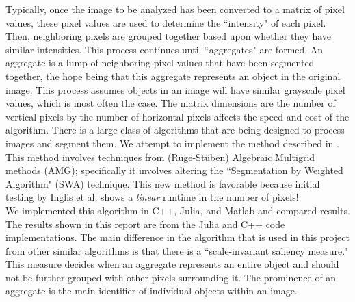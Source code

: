 \documentclass[12pt]{article}%
\begin{document}
Typically, once the image to be analyzed has been converted to a matrix of pixel values, these pixel values are used to determine the ``intensity" of each pixel.  Then, neighboring pixels are grouped together based upon whether they have similar intensities.  This process continues until ``aggregates" are formed.  An aggregate is a lump of neighboring pixel values that have been segmented together, the hope being that this aggregate represents an object in the original image. This process assumes objects in an image will have similar grayscale pixel values, which is most often the case. The matrix dimensions are the number of vertical pixels by the number of horizontal pixels affects the speed and cost of the algorithm.  There is a large class of algorithms that are being designed to process images and segment them. We attempt to implement the method described in \cite{inglis:2010}. This method involves techniques from (Ruge-St\"uben) Algebraic Multigrid methods (AMG); specifically it involves altering the ``Segmentation by Weighted Algorithm" (SWA) technique.  This new method is favorable because initial testing by Inglis et al. shows a \emph{linear} runtime in the number of pixels!\\

We implemented this algorithm in C++, Julia, and Matlab and compared results.  The results shown in this report are from the Julia and C++ code implementations.  The main difference in the algorithm that is used in this project from other similar algorithms is that there is a ``scale-invariant saliency measure." This measure decides when an aggregate represents an entire object and should not be further grouped with other pixels  surrounding it.  The prominence of an aggregate is the main identifier of individual objects within an image.
\end{document}
